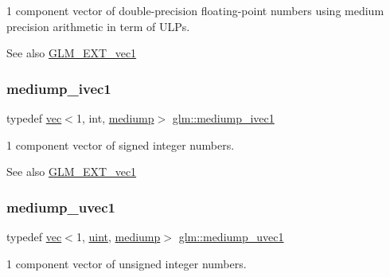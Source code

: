 1 component vector of double-\/precision floating-\/point numbers using medium precision arithmetic in term of U\+L\+Ps.

\begin{DoxySeeAlso}{See also}
\mbox{\hyperlink{group__ext__vec1}{G\+L\+M\+\_\+\+E\+X\+T\+\_\+vec1}} 
\end{DoxySeeAlso}
\mbox{\label{group__ext__vec1_gaa3adbc518fe07a292115c7662327effc}} 
\subsubsection{\texorpdfstring{mediump\+\_\+ivec1}{mediump\_ivec1}}
{\footnotesize\ttfamily typedef \mbox{\hyperlink{structglm_1_1vec}{vec}}$<$1, int, \mbox{\hyperlink{namespaceglm_a36ed105b07c7746804d7fdc7cc90ff25a6416f3ea0c9025fb21ed50c4d6620482}{mediump}}$>$ \mbox{\hyperlink{group__ext__vec1_gaa3adbc518fe07a292115c7662327effc}{glm\+::mediump\+\_\+ivec1}}}

1 component vector of signed integer numbers.

\begin{DoxySeeAlso}{See also}
\mbox{\hyperlink{group__ext__vec1}{G\+L\+M\+\_\+\+E\+X\+T\+\_\+vec1}} 
\end{DoxySeeAlso}
\mbox{\label{group__ext__vec1_ga30942ba23745b3fd4ec1fbd3068f7de4}} 
\subsubsection{\texorpdfstring{mediump\+\_\+uvec1}{mediump\_uvec1}}
{\footnotesize\ttfamily typedef \mbox{\hyperlink{structglm_1_1vec}{vec}}$<$1, \mbox{\hyperlink{group__core__precision_ga4fd29415871152bfb5abd588334147c8}{uint}}, \mbox{\hyperlink{namespaceglm_a36ed105b07c7746804d7fdc7cc90ff25a6416f3ea0c9025fb21ed50c4d6620482}{mediump}}$>$ \mbox{\hyperlink{group__ext__vec1_ga30942ba23745b3fd4ec1fbd3068f7de4}{glm\+::mediump\+\_\+uvec1}}}

1 component vector of unsigned integer numbers.

